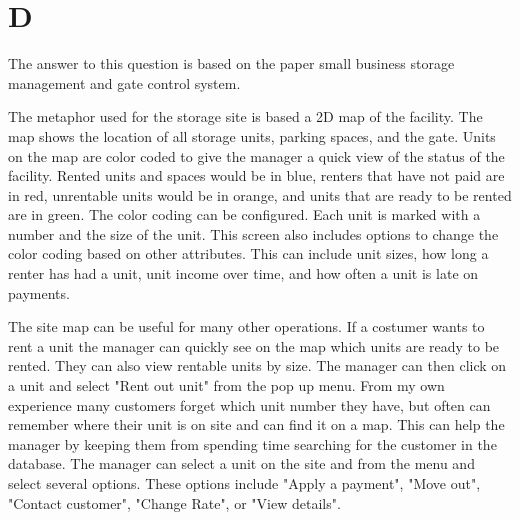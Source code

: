 \documentclass[12pt]{article}
\begin{document}
\section*{D}

The answer to this question is based on the paper small business storage 
management and gate control system.

The metaphor used for the storage site is based a 2D map of the facility.
The map shows the location of all storage units, parking spaces, and the 
gate.  Units on the map are color coded to give the manager a quick view
of the status of the facility.  Rented units and spaces would be in blue,
renters that have not paid are in red, unrentable units would be in orange,
and units that are ready to be rented are in green.  The color coding can
be configured.  Each unit is marked 
with a number and the size of the unit.  This screen also includes options
to change the color coding based on other attributes.  This can include 
unit sizes, how long a renter has had a unit, unit income over time, and
how often a unit is late on payments.

The site map can be useful for many other operations.  If a costumer wants 
to rent a unit the manager can quickly see on the map which units are ready
to be rented.  They can also view rentable units by size.  The manager can 
then click on a unit and select "Rent out unit" from the pop up menu.  From
my own experience many customers forget which unit number they have, but 
often can remember where their unit is on site and can find it on a map.  
This
can help the manager by keeping them from spending time searching for the
customer in the database.  The manager can select a unit on the site and 
from the menu and select several options.  These options include "Apply a
payment", "Move out", "Contact customer", "Change Rate", or "View details".
\end{document}
